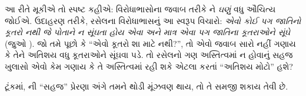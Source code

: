\documentclass[../../../include/open-logic-section]{subfiles}
\begin{document}
આ રીતે મૂકીએ તો સ્પષ્ટ કહીએ: વિરોધાભાસોના જવાબ તરીકે
\limofsize{}ને \emph{ઘણું} વધુ ઔચિત્ય જોઈએ. ઉદાહરણ
તરીકે, રસેલના વિરોધાભાસનું આ સ્વરૂપ વિચારો:
\emph{એવો કોઈ પગ જાતિનો કૂતરો નથી જે પોતાને ન સૂંઘતા
હોય એવા અને માત્ર એવા પગ જાતિના કૂતરાઓને સૂંઘે}
(જુઓ ). જો તમે પૂછો કે
``એવો કૂતરો શા માટે નથી?'', તો એવો જવાબ સારો નહીં ગણાય
કે તેને અતિશય વધુ કૂતરાઓને સૂંઘવા પડે. તો રસેલનો
ગણ અસ્તિત્વમાં ન હોવાનું સહજ ખુલાસો એવો કેમ ગણાય કે
તે અસ્તિત્વમાં રહી શકે એટલા કરતાં ``અતિશય મોટો'' હશે?

ટૂંકમાં, \limofsize{}ની ``સહજ'' પ્રેરણા અંગે તમને
થોડી મૂંઝવણ થાય, તો તે સમજી શકાય તેવી છે.
\end{document}
